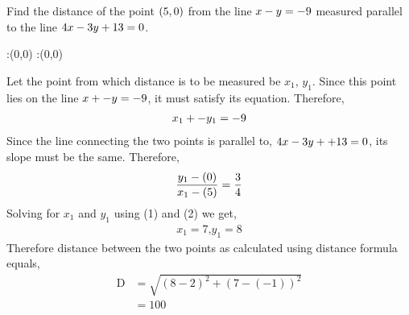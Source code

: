 \question Find the distance of the point $(5, 0)$ from the line 
$ x - y = -9$ measured parallel to the line 
$4 x -3 y +13 = 0$.



\watchout

\ifprintanswers
  \begin{marginfigure}
      :(0,0)
      :(0,0)
    \figdrawbegin{}
      \figdrawline [100,101]
    \figdrawend
    \figvisu{\figBoxA}{}{%
    }
    \centerline{\box\figBoxA}
  \end{marginfigure}
\fi 

\begin{solution}[\halfpage]
  Let the point from which distance is to be measured be $x_{1}$, $y_{1}$.
  Since this point lies on the line $ x + - y = -9$, it 
  must satisfy its equation. Therefore,
  \begin{align}
  	 x_{1} + - y_{1} = -9  	
  \end{align}  
  Since the line connecting the two points is parallel to, $4 x 
  -3 y + +13 = 0$, its slope must be the same. Therefore,
  \begin{align}
  	\dfrac{y_{1}-(0)}{x_{1}-(5)} = \dfrac{3}{4}
  \end{align}
  Solving for $x_{1}$ and $y_{1}$ using (1) and (2) we get,
  \begin{align}
  	x_{1} = 7 \text{,} y_{1} = 8 \nonumber
  \end{align}
  Therefore distance between the two points as calculated using
  distance formula equals,
  \begin{align}
  	\text{D} &= \sqrt{(8-2)^2+(7-(-1))^2} \nonumber \\
  			 &= 100 \nonumber
  \end{align}
\end{solution}

